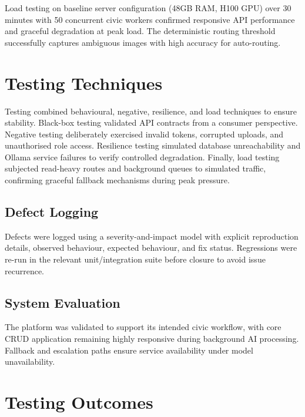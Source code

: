Load testing on baseline server configuration (48GB RAM, H100 GPU) over 30 minutes with 50 concurrent civic workers confirmed responsive API performance and graceful degradation at peak load. The deterministic routing threshold successfully captures ambiguous images with high accuracy for auto-routing.

\section{Testing Techniques}

Testing combined behavioural, negative, resilience, and load techniques to ensure stability. Black-box testing validated API contracts from a consumer perspective. Negative testing deliberately exercised invalid tokens, corrupted uploads, and unauthorised role access. Resilience testing simulated database unreachability and Ollama service failures to verify controlled degradation. Finally, load testing subjected read-heavy routes and background queues to simulated traffic, confirming graceful fallback mechanisms during peak pressure.

\subsection{Defect Logging}

Defects were logged using a severity-and-impact model with explicit reproduction details, observed behaviour, expected behaviour, and fix status. Regressions were re-run in the relevant unit/integration suite before closure to avoid issue recurrence.

\subsection{System Evaluation}

The platform was validated to support its intended civic workflow, with core CRUD application remaining highly responsive during background AI processing. Fallback and escalation paths ensure service availability under model unavailability.

\section{Testing Outcomes}

